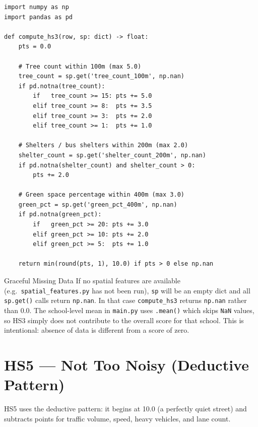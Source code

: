 \documentclass[11pt,a4paper,openany]{book}
\begin{document}
\begin{lstlisting}[style=python, caption={src/scoring/hs3.py --- spatial indicator pattern.}]
import numpy as np
import pandas as pd

def compute_hs3(row, sp: dict) -> float:
    pts = 0.0

    # Tree count within 100m (max 5.0)
    tree_count = sp.get('tree_count_100m', np.nan)
    if pd.notna(tree_count):
        if   tree_count >= 15: pts += 5.0
        elif tree_count >= 8:  pts += 3.5
        elif tree_count >= 3:  pts += 2.0
        elif tree_count >= 1:  pts += 1.0

    # Shelters / bus shelters within 200m (max 2.0)
    shelter_count = sp.get('shelter_count_200m', np.nan)
    if pd.notna(shelter_count) and shelter_count > 0:
        pts += 2.0

    # Green space percentage within 400m (max 3.0)
    green_pct = sp.get('green_pct_400m', np.nan)
    if pd.notna(green_pct):
        if   green_pct >= 20: pts += 3.0
        elif green_pct >= 10: pts += 2.0
        elif green_pct >= 5:  pts += 1.0

    return min(round(pts, 1), 10.0) if pts > 0 else np.nan
\end{lstlisting}

\begin{warnbox}{Graceful Missing Data}
If no spatial features are available (e.g.\ \texttt{spatial\_features.py} has not been run), \texttt{sp} will be an empty dict and all \texttt{sp.get()} calls return \texttt{np.nan}. In that case \texttt{compute\_hs3} returns \texttt{np.nan} rather than 0.0. The school-level mean in \texttt{main.py} uses \texttt{.mean()} which skips \texttt{NaN} values, so HS3 simply does not contribute to the overall score for that school. This is intentional: absence of data is different from a score of zero.
\end{warnbox}

\section{HS5 --- Not Too Noisy (Deductive Pattern)}

HS5 uses the deductive pattern: it begins at 10.0 (a perfectly quiet street) and subtracts points for traffic volume, speed, heavy vehicles, and lane count.
\end{document}
